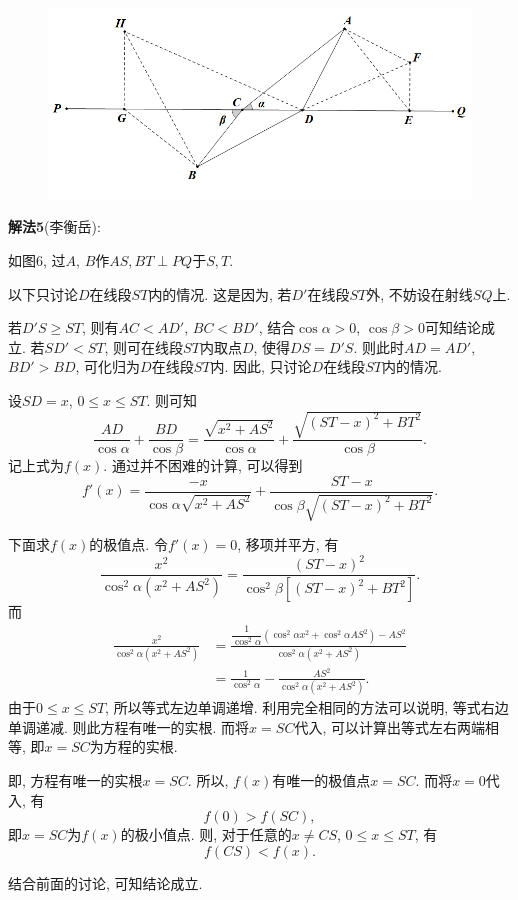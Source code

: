 \documentclass{article}
\begin{document}
\begin{figure}[htbp]
	\centering
	\includegraphics[width=0.6\textheight]{5.png}
	\caption{}
\end{figure}\par
\textbf{解法5}({\fangsong 李衡岳}):\par
如图6, 过$A$, $B$作$AS, BT\perp PQ$于$S, T$.\par 
以下只讨论$D$在线段$ST$内的情况. 这是因为, 若$D'$在线段$ST$外, 不妨设在射线$SQ$上. \par 
若$D'S\ge ST$, 则有$AC<AD'$, $BC<BD'$, 结合$\cos\alpha>0$, $\cos\beta>0$可知结论成立. 若$SD'<ST$, 则可在线段$ST$内取点$D$, 使得$DS=D'S$. 则此时$AD=AD'$, $BD'>BD$, 可化归为$D$在线段$ST$内. 因此, 只讨论$D$在线段$ST$内的情况.\par
设$SD=x$, $0\le x\le ST$. 则可知
\[\frac{AD}{\cos\alpha}+\frac{BD}{\cos\beta}=\frac{\sqrt{x^2+AS^2}}{\cos\alpha}+\frac{\sqrt{(ST-x)^2+BT^2}}{\cos\beta}.\]
记上式为$f(x)$. 通过并不困难的计算, 可以得到
\[f'(x)=\frac{-x}{\cos{\alpha}\sqrt{x^2+AS^2}}+\frac{ST-x}{\cos{\beta}\sqrt{(ST-x)^2+BT^2}}.\]\par
下面求$f(x)$的极值点. 令$f'(x)=0$, 移项并平方, 有
\[\frac{x^2}{\cos^2\alpha (x^2+AS^2)}=\frac{(ST-x)^2}{\cos^2\beta \left[(ST-x)^2+BT^2\right]}.\]
而\begin{align*}
	\frac{x^2}{\cos^2\alpha (x^2+AS^2)}&=\frac{\dfrac{1}{\cos^2\alpha}\left(\cos^2\alpha x^2+\cos^2\alpha AS^2\right)-AS^2}{\cos^2\alpha (x^2+AS^2)}\\
	&=\frac{1}{\cos^2\alpha}-\frac{AS^2}{\cos^2\alpha (x^2+AS^2)}.
\end{align*}
由于$0\le x\le ST$, 所以等式左边单调递增. 利用完全相同的方法可以说明, 等式右边单调递减. 则此方程有唯一的实根. 而将$x=SC$代入, 可以计算出等式左右两端相等, 即$x=SC$为方程的实根. \par
即, 方程有唯一的实根$x=SC$. 所以, $f(x)$有唯一的极值点$x=SC$. 而将$x=0$代入, 有
\[f(0)>f(SC),\]
即$x=SC$为$f(x)$的极小值点. 则, 对于任意的$x\neq CS$, $0\le x\le ST$, 有
\[f(CS)<f(x).\]\par
结合前面的讨论, 可知结论成立.
\end{document}
